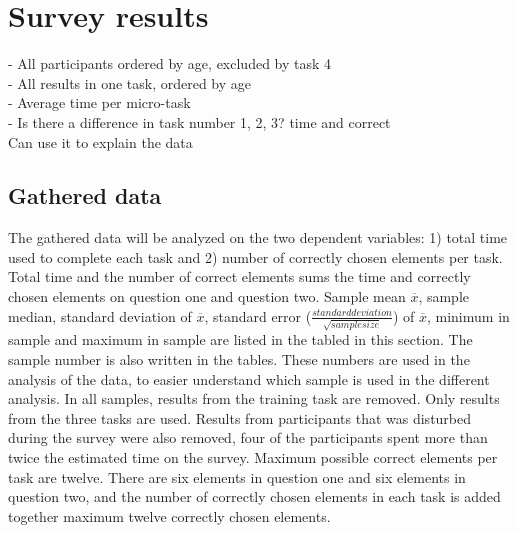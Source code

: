 \section{Survey results}\label{sec:survey_results}

- All participants ordered by age, excluded by task 4 \\
- All results in one task, ordered by age \\ 
- Average time per micro-task \\
- Is there a difference in task number 1, 2, 3? time and correct  \\
Can use it to explain the data

\subsection{Gathered data}\label{sec:gathereddata}

The gathered data will be analyzed on the two dependent variables: 1) total time used to complete each task and 2) number of correctly chosen elements per task. Total time and the number of correct elements sums the time and correctly chosen elements on question one and question two. Sample mean $\overline{x}$, sample median, standard deviation of $\overline{x}$, standard error ($\frac{standard deviation}{\sqrt{sample size}}$) of $\overline{x}$, minimum in sample and maximum in sample are listed in the tabled in this section. The sample number is also written in the tables. These numbers are used in the analysis of the data, to easier understand which sample is used in the different analysis. In all samples, results from the training task are removed. Only results from the three tasks are used. Results from participants that was disturbed during the survey were also removed, four of the participants spent more than twice the estimated time on the survey. Maximum possible correct elements per task are twelve. There are six elements in question one and six elements in question two, and the number of correctly chosen elements in each task is added together maximum twelve correctly chosen elements.



